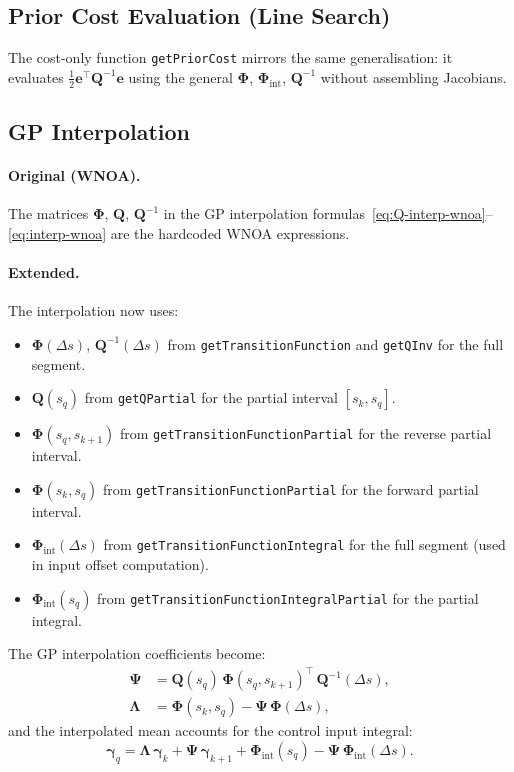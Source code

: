 \documentclass[11pt,a4paper]{article}
\newcommand{\inv}{^{-1}}
\newcommand{\bgamma}{\bm{\gamma}}
\newcommand{\bPhi}{\bm{\Phi}}
\newcommand{\be}{\mathbf{e}}
\newcommand{\bQ}{\mathbf{Q}}
\begin{document}
\subsection{Prior Cost Evaluation (Line Search)}
The cost-only function \texttt{getPriorCost} mirrors the same generalisation:
it evaluates $\frac{1}{2}\be^\top\bQ\inv\be$ using the general $\bPhi$, $\bPhi_{\mathrm{int}}$, $\bQ\inv$ without assembling Jacobians.

\subsection{GP Interpolation}
\label{sec:interp-change}

\paragraph{Original (WNOA).}
The matrices $\bPhi$, $\bQ$, $\bQ\inv$ in the GP interpolation formulas~\eqref{eq:Q-interp-wnoa}--\eqref{eq:interp-wnoa} are the hardcoded WNOA expressions.

\paragraph{Extended.}
The interpolation now uses:
\begin{itemize}
    \item $\bPhi(\Delta s)$, $\bQ\inv(\Delta s)$ from \texttt{getTransitionFunction} and \texttt{getQInv} for the full segment.
    \item $\bQ(s_q)$ from \texttt{getQPartial} for the partial interval $[s_k, s_q]$.
    \item $\bPhi(s_q, s_{k+1})$ from \texttt{getTransitionFunctionPartial} for the reverse partial interval.
    \item $\bPhi(s_k, s_q)$ from \texttt{getTransitionFunctionPartial} for the forward partial interval.
    \item $\bPhi_{\mathrm{int}}(\Delta s)$ from \texttt{getTransitionFunctionIntegral} for the full segment (used in input offset computation).
    \item $\bPhi_{\mathrm{int}}(s_q)$ from \texttt{getTransitionFunctionIntegralPartial} for the partial integral.
\end{itemize}

The GP interpolation coefficients become:
\begin{align}
    \bm{\Psi} &= \bQ(s_q)\,\bPhi(s_q, s_{k+1})^\top\,\bQ\inv(\Delta s), \\
    \bm{\Lambda} &= \bPhi(s_k, s_q) - \bm{\Psi}\,\bPhi(\Delta s),
\end{align}
and the interpolated mean accounts for the control input integral:
\begin{equation}
    \bgamma_q = \bm{\Lambda}\,\bgamma_k + \bm{\Psi}\,\bgamma_{k+1} + \bPhi_{\mathrm{int}}(s_q) - \bm{\Psi}\,\bPhi_{\mathrm{int}}(\Delta s).
\end{equation}
\end{document}

